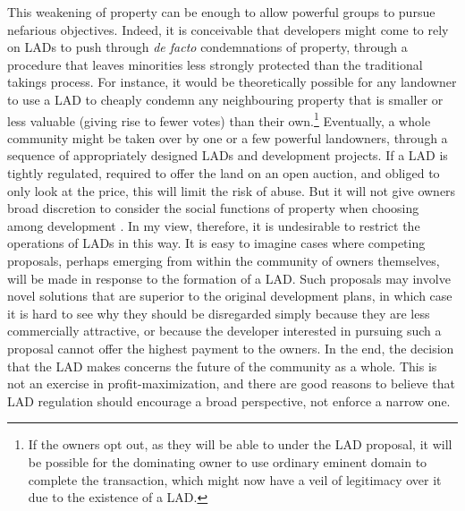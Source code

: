 {This weakening of property can be enough to allow powerful groups to pursue nefarious objectives. Indeed, it is conceivable that developers might come to rely on LADs to push through {\it de facto} condemnations of property, through a procedure that leaves minorities less strongly protected than the traditional takings process. For instance, it would be theoretically possible for any landowner to use a LAD to cheaply condemn any neighbouring property that is smaller or less valuable (giving rise to fewer votes) than their own.\footnote{If the owners opt out, as they will be able to under the LAD proposal, it will be possible for the dominating owner to use ordinary eminent domain to complete the transaction, which might now have a veil of legitimacy over it due to the existence of a LAD.} Eventually, a whole community might be taken over by one or a few powerful landowners, through a sequence of appropriately designed LADs and development projects. %
} If a LAD is tightly regulated, required to offer the land on an open auction, and obliged to only look at the price, this will limit the risk of abuse. But it will not give owners broad discretion to consider the social functions of property when choosing among development . In my view, therefore, it is undesirable to restrict the operations of LADs in this way. It is easy to imagine cases where competing proposals, perhaps emerging from within the community of owners themselves, will be made in response to the formation of a LAD. Such proposals may involve novel solutions that are superior to the original development plans, in which case it is hard to see why they should be disregarded simply because they are less commercially attractive, or because the developer interested in pursuing such a proposal cannot offer the highest payment to the owners. In the end, the decision that the LAD makes concerns the future of the community as a whole. This is not an exercise in profit-maximization, and there are good reasons to believe that LAD regulation should encourage a broad perspective, not enforce a narrow one.

